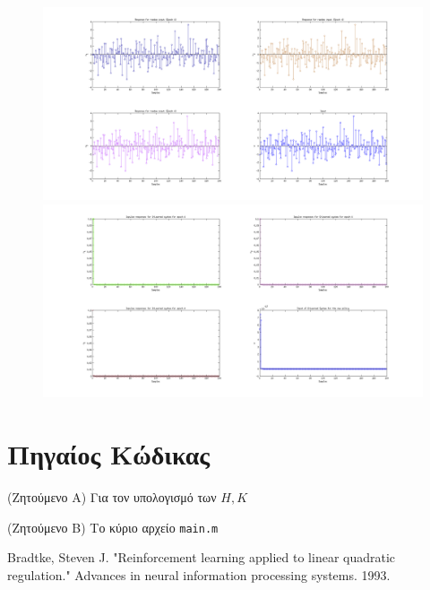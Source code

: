 \documentclass[a4paper,oneside,12pt]{article}
\begin{document}
\begin{figure}[H]
\centering
\includegraphics[scale=0.35]{s_4.png} \\
\includegraphics[scale=0.35]{q_4.png} \\
\label{}
\end{figure}


\section{Πηγαίος Κώδικας}


(Ζητούμενο Α) Για τον υπολογισμό των $H, K$ 




(Ζητούμενο Β) Το κύριο αρχείο \texttt{main.m}





\begin{thebibliography}{9}

 Bradtke, Steven J. "Reinforcement learning applied to linear quadratic regulation." Advances in neural information processing systems. 1993.

\end{thebibliography}
\end{document}
